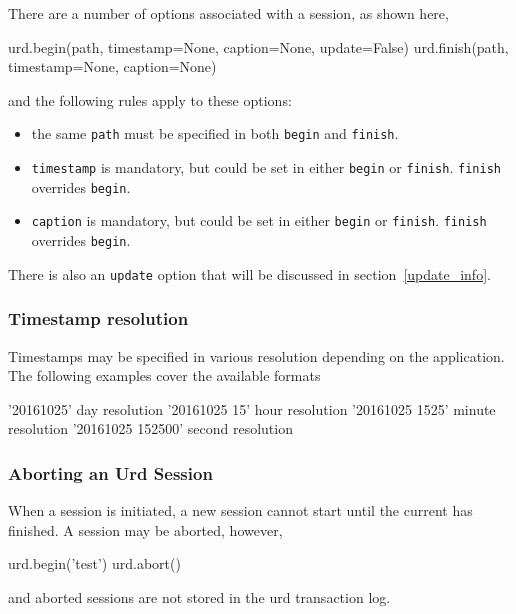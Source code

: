 There are a number of options associated with a session, as shown here,\\
\begin{python}
  urd.begin(path, timestamp=None, caption=None, update=False)
  urd.finish(path, timestamp=None, caption=None)
\end{python}
and the following rules apply to these options:
\begin{itemize}
  \item the same \texttt{path} must be specified in both \texttt{begin} and \texttt{finish}.
  \item \texttt{timestamp} is mandatory, but could be set in either \texttt{begin} or
    \texttt{finish}.  \texttt{finish} overrides \texttt{begin}.
  \item \texttt{caption} is mandatory, but could be set in either \texttt{begin} or
    \texttt{finish}.  \texttt{finish} overrides \texttt{begin}.
\end{itemize}
There is also an \texttt{update} option that will be discussed in
section~\ref{update_info}.



\subsubsection{Timestamp resolution}

Timestamps may be specified in various resolution depending on the
application.  The following examples cover the available formats\\
\begin{python}
   '20161025'              day resolution
   '20161025 15'           hour resolution
   '20161025 1525'         minute resolution
   '20161025 152500'       second resolution
\end{python}



\subsubsection{Aborting an Urd Session}

When a session is initiated, a new session cannot start until the
current has finished.  A session may be aborted, however,\\
\begin{python}
  urd.begin('test')
  urd.abort()
\end{python}
and aborted sessions are not stored in the urd transaction log.



